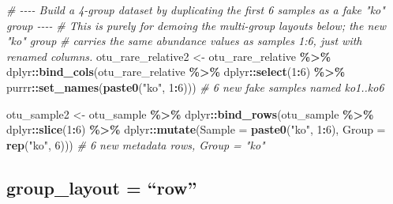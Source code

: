 \documentclass[
]{book}
\newenvironment{Shaded}{\begin{snugshade}}{\end{snugshade}}
\newcommand{\AttributeTok}[1]{\textcolor[rgb]{0.13,0.29,0.53}{#1}}
\newcommand{\CommentTok}[1]{\textcolor[rgb]{0.56,0.35,0.01}{\textit{#1}}}
\newcommand{\DecValTok}[1]{\textcolor[rgb]{0.00,0.00,0.81}{#1}}
\newcommand{\FunctionTok}[1]{\textcolor[rgb]{0.13,0.29,0.53}{\textbf{#1}}}
\newcommand{\NormalTok}[1]{#1}
\newcommand{\OtherTok}[1]{\textcolor[rgb]{0.56,0.35,0.01}{#1}}
\newcommand{\SpecialCharTok}[1]{\textcolor[rgb]{0.81,0.36,0.00}{\textbf{#1}}}
\newcommand{\StringTok}[1]{\textcolor[rgb]{0.31,0.60,0.02}{#1}}
\begin{document}
\begin{Shaded}
\begin{Highlighting}[]
\CommentTok{\# {-}{-}{-}{-} Build a 4{-}group dataset by duplicating the first 6 samples as a fake "ko" group {-}{-}{-}{-}}
\CommentTok{\# This is purely for demoing the multi{-}group layouts below; the new "ko" group}
\CommentTok{\# carries the same abundance values as samples 1:6, just with renamed columns.}
\NormalTok{otu\_rare\_relative2 }\OtherTok{\textless{}{-}}\NormalTok{ otu\_rare\_relative }\SpecialCharTok{\%\textgreater{}\%}
\NormalTok{  dplyr}\SpecialCharTok{::}\FunctionTok{bind\_cols}\NormalTok{(otu\_rare\_relative }\SpecialCharTok{\%\textgreater{}\%}
\NormalTok{                     dplyr}\SpecialCharTok{::}\FunctionTok{select}\NormalTok{(}\DecValTok{1}\SpecialCharTok{:}\DecValTok{6}\NormalTok{) }\SpecialCharTok{\%\textgreater{}\%}
\NormalTok{                     purrr}\SpecialCharTok{::}\FunctionTok{set\_names}\NormalTok{(}\FunctionTok{paste0}\NormalTok{(}\StringTok{"ko"}\NormalTok{, }\DecValTok{1}\SpecialCharTok{:}\DecValTok{6}\NormalTok{)))  }\CommentTok{\# 6 new fake samples named ko1..ko6}

\NormalTok{otu\_sample2 }\OtherTok{\textless{}{-}}\NormalTok{ otu\_sample }\SpecialCharTok{\%\textgreater{}\%}
\NormalTok{  dplyr}\SpecialCharTok{::}\FunctionTok{bind\_rows}\NormalTok{(otu\_sample }\SpecialCharTok{\%\textgreater{}\%}
\NormalTok{                     dplyr}\SpecialCharTok{::}\FunctionTok{slice}\NormalTok{(}\DecValTok{1}\SpecialCharTok{:}\DecValTok{6}\NormalTok{) }\SpecialCharTok{\%\textgreater{}\%}
\NormalTok{                     dplyr}\SpecialCharTok{::}\FunctionTok{mutate}\NormalTok{(}\AttributeTok{Sample =} \FunctionTok{paste0}\NormalTok{(}\StringTok{"ko"}\NormalTok{, }\DecValTok{1}\SpecialCharTok{:}\DecValTok{6}\NormalTok{),}
                                   \AttributeTok{Group  =} \FunctionTok{rep}\NormalTok{(}\StringTok{"ko"}\NormalTok{, }\DecValTok{6}\NormalTok{))) }\CommentTok{\# 6 new metadata rows, Group = "ko"}
\end{Highlighting}
\end{Shaded}

\subsection{group\_layout = ``row''}\label{group_layout-row}
\end{document}
